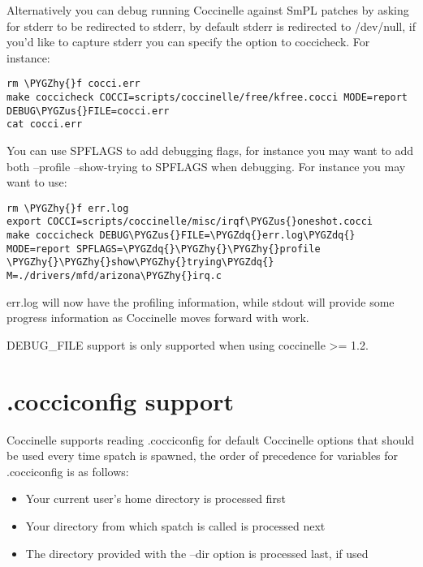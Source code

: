 \documentclass[a4paper,8pt,english]{sphinxmanual}
\def\PYGZus{\char`\_}
\def\PYGZhy{\char`\-}
\def\PYGZdq{\char`\"}
\begin{document}
Alternatively you can debug running Coccinelle against SmPL patches
by asking for stderr to be redirected to stderr, by default stderr
is redirected to /dev/null, if you'd like to capture stderr you
can specify the  option to coccicheck. For
instance:

\begin{Verbatim}[commandchars=\\\{\}]
rm \PYGZhy{}f cocci.err
make coccicheck COCCI=scripts/coccinelle/free/kfree.cocci MODE=report DEBUG\PYGZus{}FILE=cocci.err
cat cocci.err
\end{Verbatim}

You can use SPFLAGS to add debugging flags, for instance you may want to
add both --profile --show-trying to SPFLAGS when debugging. For instance
you may want to use:

\begin{Verbatim}[commandchars=\\\{\}]
rm \PYGZhy{}f err.log
export COCCI=scripts/coccinelle/misc/irqf\PYGZus{}oneshot.cocci
make coccicheck DEBUG\PYGZus{}FILE=\PYGZdq{}err.log\PYGZdq{} MODE=report SPFLAGS=\PYGZdq{}\PYGZhy{}\PYGZhy{}profile \PYGZhy{}\PYGZhy{}show\PYGZhy{}trying\PYGZdq{} M=./drivers/mfd/arizona\PYGZhy{}irq.c
\end{Verbatim}

err.log will now have the profiling information, while stdout will
provide some progress information as Coccinelle moves forward with
work.

DEBUG\_FILE support is only supported when using coccinelle \textgreater{}= 1.2.


\section{.cocciconfig support}
\label{dev-tools/coccinelle:cocciconfig-support}
Coccinelle supports reading .cocciconfig for default Coccinelle options that
should be used every time spatch is spawned, the order of precedence for
variables for .cocciconfig is as follows:
\begin{itemize}
\item {} 
Your current user's home directory is processed first

\item {} 
Your directory from which spatch is called is processed next

\item {} 
The directory provided with the --dir option is processed last, if used

\end{itemize}
\end{document}
